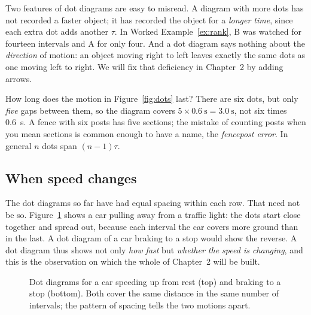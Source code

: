 \documentclass[11pt,twoside,openany]{book}
\begin{document}
Two features of dot diagrams are easy to misread. A diagram with more dots has not recorded a faster object; it has recorded the object for a \emph{longer time}, since each extra dot adds another $\tau$. In Worked Example~\ref{ex:rank}, B was watched for fourteen intervals and A for only four. And a dot diagram says nothing about the \emph{direction} of motion: an object moving right to left leaves exactly the same dots as one moving left to right. We will fix that deficiency in Chapter~2 by adding arrows.

\begin{modelnote}
How long does the motion in Figure~\ref{fig:dots} last? There are six dots, but only \emph{five} gaps between them, so the diagram covers $5 \times \SI{0.6}{\second} = \SI{3.0}{\second}$, not six times \SI{0.6}{\second}. A fence with six posts has five sections; the mistake of counting posts when you mean sections is common enough to have a name, the \emph{fencepost error}. In general $n$ dots span $(n-1)\tau$.
\end{modelnote}

\subsection{When speed changes}

The dot diagrams so far have had equal spacing within each row. That need not be so. Figure~\ref{fig:changing} shows a car pulling away from a traffic light: the dots start close together and spread out, because each interval the car covers more ground than in the last. A dot diagram of a car braking to a stop would show the reverse. A dot diagram thus shows not only \emph{how fast} but \emph{whether the speed is changing}, and this is the observation on which the whole of Chapter~2 will be built.

\begin{figure}[htb]
\centering
{}
\caption{Dot diagrams for a car speeding up from rest (top) and braking to a stop (bottom). Both cover the same distance in the same number of intervals; the pattern of spacing tells the two motions apart.}
\label{fig:changing}
\end{figure}
\end{document}
